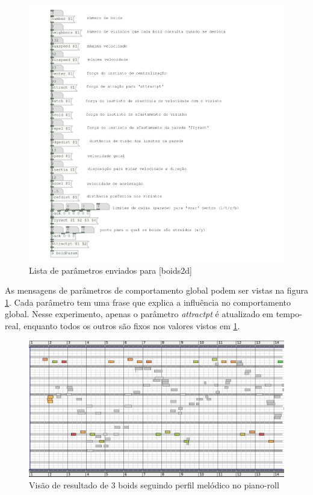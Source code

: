 \documentclass{ppgmus}
\begin{document}
\begin{figure}
\includegraphics[scale=.6]{boids-param}
\caption{Lista de parâmetros enviados para [boids2d]}
\label{boids-param}
\end{figure} 

As mensagens de parâmetros de comportamento global podem ser vistas na figura \ref{boids-param}. 
Cada parâmetro tem uma frase que explica a influência no comportamento global. Nesse experimento,
apenas o parâmetro \textit{attractpt} é atualizado em tempo-real, enquanto todos os outros são
fixos nos valores vistos em \ref{boids-param}.

\begin{figure}
\includegraphics[scale=.5]{boids-pianoroll}
\caption{Visão de resultado de 3 boids seguindo perfil melódico no piano-roll}
\label{boids-pianoroll}
\end{figure} 
\end{document}
